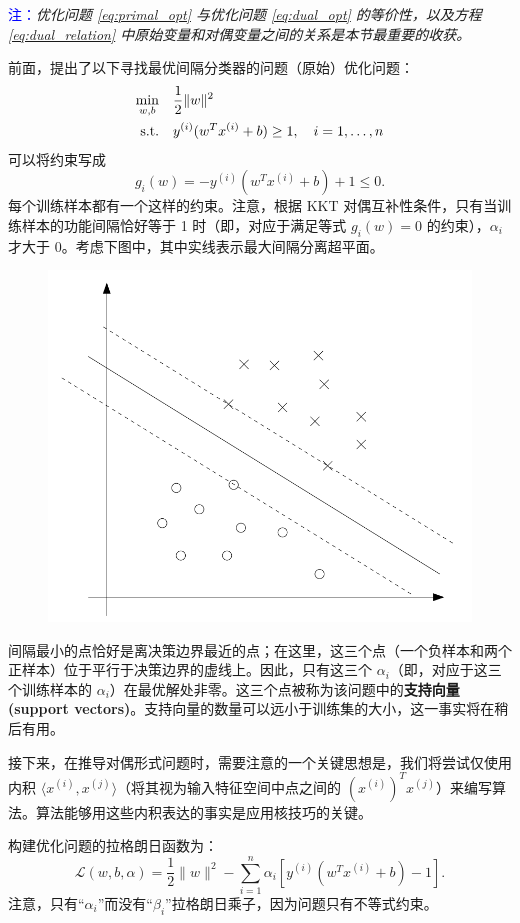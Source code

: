 \textcolor{blue}{注：}\textit{优化问题 \eqref{eq:primal_opt} 与优化问题 \eqref{eq:dual_opt} 的等价性，以及方程 \eqref{eq:dual_relation} 中原始变量和对偶变量之间的关系是本节最重要的收获。}

前面，提出了以下寻找最优间隔分类器的问题（原始）优化问题：
\begin{align}
    \min_{w,b} \quad &\frac{1}{2}\|w\|^2 \label{eq:primal_opt}\\
    \text{s.t.} \quad &y^{(i)}(w^T x^{(i)} + b) \ge 1, \quad i = 1, \dots, n \notag
\end{align}
可以将约束写成
\[
    g_i(w) = -y^{(i)}(w^T x^{(i)} + b) + 1 \le 0.
\]
每个训练样本都有一个这样的约束。注意，根据 KKT 对偶互补性条件，只有当训练样本的功能间隔恰好等于 1 时（即，对应于满足等式 $g_i(w) = 0$ 的约束），$\alpha_i$ 才大于 0。考虑下图中，其中实线表示最大间隔分离超平面。

\begin{figure}[H]
    \centering
    \includegraphics[width=0.5\linewidth]{figs/svm_max_margin.png}
\end{figure}

间隔最小的点恰好是离决策边界最近的点；在这里，这三个点（一个负样本和两个正样本）位于平行于决策边界的虚线上。因此，只有这三个 $\alpha_i$（即，对应于这三个训练样本的 $\alpha_i$）在最优解处非零。这三个点被称为该问题中的\textbf{支持向量 (support vectors)}。支持向量的数量可以远小于训练集的大小，这一事实将在稍后有用。

接下来，在推导对偶形式问题时，需要注意的一个关键思想是，我们将尝试仅使用内积 $\langle x^{(i)}, x^{(j)} \rangle$（将其视为输入特征空间中点之间的 $(x^{(i)})^T x^{(j)}$）来编写算法。算法能够用这些内积表达的事实是应用核技巧的关键。

构建优化问题的拉格朗日函数为：
\begin{equation}
    \mathcal{L}(w, b, \alpha) = \frac{1}{2}\|w\|^2 - \sum_{i=1}^n \alpha_i [y^{(i)}(w^T x^{(i)} + b) - 1]. \label{eq:la_opt}
\end{equation}
注意，只有“$\alpha_i$”而没有“$\beta_i$”拉格朗日乘子，因为问题只有不等式约束。


